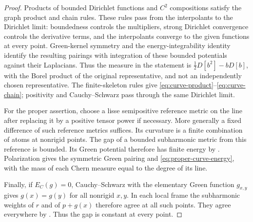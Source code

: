 \documentclass[11pt,reqno]{amsart}
\theoremstyle{definition}
\theoremstyle{remark}
\numberwithin{equation}{section}
\begin{document}
\begin{proof}
Products of bounded Dirichlet functions and \(C^2\) compositions
satisfy the graph product and chain rules. These rules pass from
the interpolants to the Dirichlet limit: boundedness controls the
multipliers, strong Dirichlet convergence controls the derivative
terms, and the interpolants converge to the given functions at
every point. Green-kernel symmetry
\cite[Remark~3.4.15]{Thuillier} and the energy-integrability
identity \cite[Proposition~3.5.7 and its local variant,
Proposition~3.5.10]{Thuillier} identify the resulting pairings with
integration of these bounded potentials against their
Laplacians. Thus the measure in the statement is
\(\tfrac12D[b^2]-bD[b]\), with the Borel product of the original
representative, and not an independently chosen representative.
The finite-skeleton rules give
\eqref{eq:curve-product}--\eqref{eq:curve-chain}; positivity and
Cauchy--Schwarz pass through the same Dirichlet limit.

For the proper assertion, choose a lisse semipositive reference
metric on the line after replacing it by a positive tensor power
if necessary. More generally a fixed difference of such reference
metrics suffices. Its curvature is a finite combination of atoms
at nonrigid points. The gap of a bounded subharmonic metric from
this reference is bounded. Its Green potential therefore has
finite energy by \cite[Proposition~3.5.7]{Thuillier}.
Polarization gives the symmetric Green pairing and
\eqref{eq:proper-curve-energy}, with the mass of each Chern
measure equal to the degree of its line.

Finally, if \(E_C(g)=0\), Cauchy--Schwarz with the elementary Green
function \(g_{x,y}\) gives \(g(x)=g(y)\) for all nonrigid \(x,y\).
In each local frame the subharmonic weights of \(r\) and of
\(p+g(x)\) therefore agree at all such points. They agree everywhere
by \cite[Lemma~3.4.1]{Thuillier}. Thus the gap is constant at every point.
\end{proof}
\end{document}
